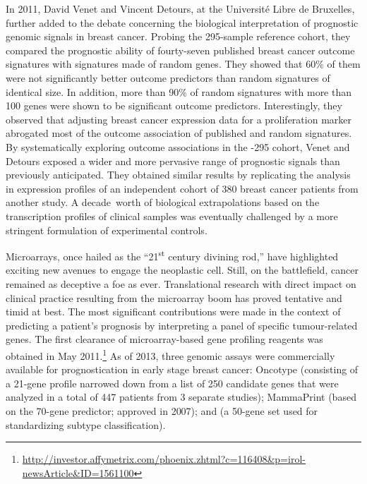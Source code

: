 
In 2011, David Venet and Vincent Detours, at the Université Libre de Bruxelles,
further added to the debate concerning the biological interpretation of
prognostic genomic signals in breast cancer.\cite{venet_most_2011} Probing the
\mbox{295-sample}  reference cohort, they compared the prognostic
ability of \mbox{fourty-seven} published breast cancer outcome signatures with
signatures made of random genes.  They showed that 60\% of them were not
significantly better outcome predictors than random signatures of identical
size.  In addition, more than 90\% of random signatures with more than 100 genes
were shown to be significant outcome predictors.  Interestingly, they observed
that adjusting breast cancer expression data for a proliferation marker
abrogated most of the outcome association of published and random signatures.
By systematically exploring outcome associations in the -295
cohort, Venet and Detours exposed a wider and more pervasive range of prognostic
signals than previously anticipated.  They obtained similar results by
replicating the analysis in expression profiles of an independent cohort of 380
breast cancer patients from another study.\cite{loi_definition_2007} A
\mbox{decade worth} of biological extrapolations based on the transcription
profiles of clinical samples was eventually challenged by a more stringent
formulation of experimental controls.

\medskip

Microarrays, once hailed as the ``21\textsuperscript{st} century divining
rod,''\cite{he_microarrays21st_2001} have highlighted exciting new avenues to
engage the neoplastic cell.  Still, on the battlefield, cancer remained as
deceptive a foe as ever.  Translational research with direct impact on clinical
practice resulting from the microarray boom has proved tentative and timid at
best.  The most significant contributions were made in the context of predicting
a patient's prognosis by interpreting a panel of specific \mbox{tumour-related}
genes.  The first  clearance of \mbox{microarray-based} gene
profiling reagents was obtained in May
2011.\footnote{\url{http://investor.affymetrix.com/phoenix.zhtml?c=116408&p=irol-newsArticle&ID=1561100}}
As of 2013,\cite{kittaneh_molecular_2013} three genomic assays were commercially
available for prognostication in early stage breast cancer: Oncotype
 (consisting of a \mbox{21-gene} profile narrowed down from a list
of 250 candidate genes that were analyzed in a total of 447 patients from 3
separate studies); MammaPrint\textcopyright{} (based on the \mbox{70-gene}
 predictor;  approved in 2007); and
 (a \mbox{50-gene} set used for standardizing subtype
classification).


